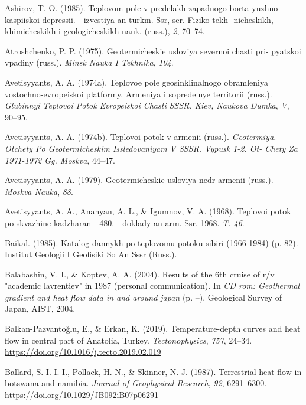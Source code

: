 \begin{CSLReferences}{1}{1}
\leavevmode{}%
Ashirov, T. O. (1985). Teplovom pole v predelakh zapadnogo borta yuzhno- kaspiiskoi depressii. - izvestiya an turkm. Ssr, ser. Fiziko-tekh- nicheskikh, khimicheskikh i geologicheskikh nauk. (russ.), \emph{2}, 70--74.

\leavevmode{}%
Atroshchenko, P. P. (1975). Geotermicheskie usloviya severnoi chasti pri- pyatskoi vpadiny (russ.). \emph{Minsk Nauka I Tekhnika}, \emph{104}.

\leavevmode{}%
Avetisyyants, A. A. (1974a). Teplovoe pole geosinklinalnogo obramleniya vostochno-evropeiskoi platformy. Armeniya i sopredelnye territorii (russ.). \emph{Glubinnyi Teplovoi Potok Evropeiskoi Chasti SSSR. Kiev, Naukova Dumka}, \emph{V}, 90--95.

\leavevmode{}%
Avetisyyants, A. A. (1974b). Teplovoi potok v armenii (russ.). \emph{Geotermiya. Otchety Po Geotermicheskim Issledovaniyam V SSSR. Vypusk 1-2. Ot- Chety Za 1971-1972 Gg. Moskva}, 44--47.

\leavevmode{}%
Avetisyyants, A. A. (1979). Geotermicheskie usloviya nedr armenii (russ.). \emph{Moskva Nauka}, \emph{88}.

\leavevmode{}%
Avetisyyants, A. A., Ananyan, A. L., \& Igumnov, V. A. (1968). Teplovoi potok po skvazhine kadzharan - 480. - doklady an arm. Ssr. 1968. \emph{T. 46}.

\leavevmode{}%
Baikal. (1985). Katalog dannykh po teplovomu potoku sibiri (1966-1984) (p. 82). Institut Geologii I Geofisiki So An Sssr (Russ.).

\leavevmode{}%
Balabashin, V. I., \& Koptev, A. A. (2004). Results of the 6th cruise of r/v "academic lavrentiev" in 1987 (personal communication). In \emph{CD rom: Geothermal gradient and heat flow data in and around japan} (p. --). Geological Survey of Japan, AIST, 2004.

\leavevmode{}%
Balkan-Pazvantoğlu, E., \& Erkan, K. (2019). Temperature-depth curves and heat flow in central part of {Anatolia}, {Turkey}. \emph{Tectonophysics}, \emph{757}, 24--34. \url{https://doi.org/10.1016/j.tecto.2019.02.019}

\leavevmode{}%
Ballard, S. I. I. I., Pollack, H. N., \& Skinner, N. J. (1987). Terrestrial heat flow in botswana and namibia. \emph{Journal of Geophysical Research}, \emph{92}, 6291--6300. \url{https://doi.org/10.1029/JB092iB07p06291}


\end{CSLReferences}
